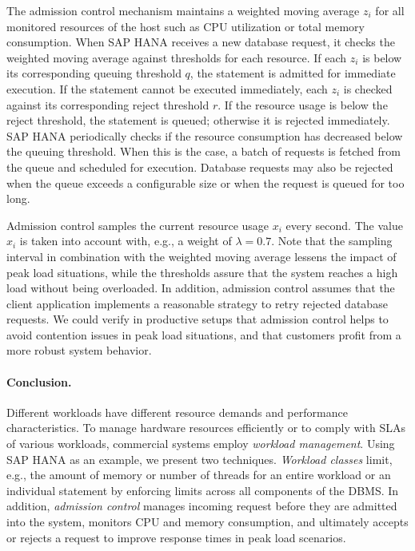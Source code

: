 \documentclass[11pt]{article}
\begin{document}
The admission control mechanism maintains a weighted moving average $z_i$ for all monitored resources of the host such as CPU utilization or total memory consumption.
When SAP HANA receives a new database request, it checks the weighted moving average against thresholds for each resource.
If each $z_i$ is below its corresponding queuing threshold $q$, the statement is admitted for immediate execution.
If the statement cannot be executed immediately, each $z_i$ is checked against its corresponding reject threshold $r$.
If the resource usage is below the reject threshold, the statement is queued; otherwise it is rejected immediately.
SAP HANA periodically checks if the resource consumption has decreased below the queuing threshold.
When this is the case, a batch of requests is fetched from the queue and scheduled for execution.
Database requests may also be rejected when the queue exceeds a configurable size or when the request is queued for too long.

Admission control samples the current resource usage $x_i$ every second.
The value $x_i$ is taken into account with, e.g., a weight of $\lambda = 0.7$.
Note that the sampling interval in combination with the weighted moving average lessens the impact of peak load situations, while the thresholds assure that the system reaches a high load without being overloaded.
In addition, admission control assumes that the client application implements a reasonable strategy to retry rejected database requests.
We could verify in productive setups that admission control helps to avoid contention issues in peak load situations, and that customers profit from a more robust system behavior.

\paragraph*{Conclusion.}
Different workloads have different resource demands and performance characteristics.
To manage hardware resources efficiently or to comply with SLAs of various workloads, commercial systems employ \emph{workload management}.
Using SAP HANA as an example, we present two techniques.
\emph{Workload classes} limit, e.g., the amount of memory or number of threads for an entire workload or an individual statement by enforcing limits across all components of the DBMS.
In addition, \emph{admission control} manages incoming request before they are admitted into the system, monitors CPU and memory consumption, and ultimately accepts or rejects a request to improve response times in peak load scenarios.
\end{document}
